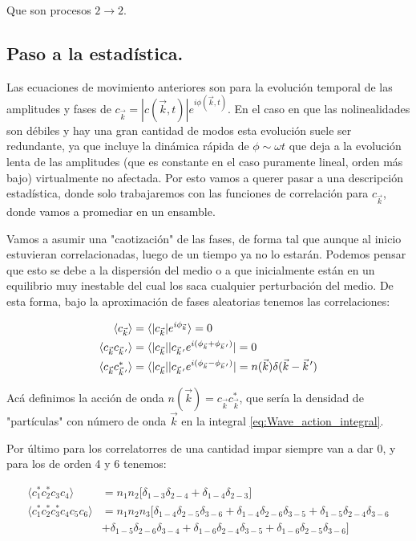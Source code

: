 Que son procesos $2\rightarrow2$.

\subsection*{Paso a la estadística.}
Las ecuaciones de movimiento anteriores son para la evolución temporal de las amplitudes y fases de $c_{\vec k} = |c(\vec k, t)|e^{i\phi(\vec k, t)}$. En el caso en que las nolinealidades son débiles y hay una gran cantidad de modos esta evolución suele ser redundante, ya que incluye la dinámica rápida de $\phi\sim\omega t$ que deja a la evolución lenta de las amplitudes (que es constante en el caso puramente lineal, orden más bajo) virtualmente no afectada. Por esto vamos a querer pasar a una descripción estadística, donde solo trabajaremos con las funciones de correlación para $c_{\vec k}$, donde vamos a promediar en un ensamble.

Vamos a asumir una "caotización" de las fases, de forma tal que aunque al inicio estuvieran correlacionadas, luego de un tiempo ya no lo estarán. Podemos pensar que esto se debe a la dispersión del medio o a que inicialmente están en un equilibrio muy inestable del cual los saca cualquier perturbación del medio. De esta forma, bajo la aproximación de fases aleatorias tenemos las correlaciones:

\begin{equation}
	\begin{split}
		\langle c_{\vec k}\rangle &= \langle |c_{\vec k}|e^{i\phi_{\vec k}}	 \rangle = 0 \\
		\langle c_{\vec k} c_{\pvec k'} \rangle &= \langle |c_{\vec k}||c_{\pvec k'} e^{i(\phi_{\vec k}+\phi_{\pvec k'})}| = 0 \\
		\langle c_{\vec k} c^*_{\pvec k'} \rangle  &= \langle |c_{\vec k}||c_{\pvec k'} e^{i(\phi_{\vec k}-\phi_{\pvec k'})}| = n(\vec k) \delta(\vec k - \pvec k')
	\end{split}
\end{equation} 

Acá definimos la acción de onda $n(\vec k) = c_{\vec k}c^*_{\vec k}$, que sería la densidad de "partículas" con número de onda $\vec k$ en la integral \eqref{eq:Wave_action_integral}.  

Por último para los correlatorres de una cantidad impar siempre van a dar 0, y para los de orden 4 y 6 tenemos:

\begin{equation}
	\begin{split}
		\langle	c_1^*c_2^*c_3c_4 \rangle & = n_1 n_2 \big[\delta_{1-3}\delta_{2-4} + \delta_{1-4}\delta_{2-3}\big] \\ 
		\langle c_1^*c_2^*c_3^*c_4c_5c_6 \rangle &= n_1n_2n_3\big[  \delta_{1-4}\delta_{2-5}\delta_{3-6} + \delta_{1-4}\delta_{2-6}\delta_{3-5} + \delta_{1-5}\delta_{2-4}\delta_{3-6} \\ 
		& +\delta_{1-5}\delta_{2-6}\delta_{3-4} + \delta_{1-6}\delta_{2-4}\delta_{3-5} + \delta_{1-6}\delta_{2-5}\delta_{3-6} \big] 
	\end{split}
\end{equation}

